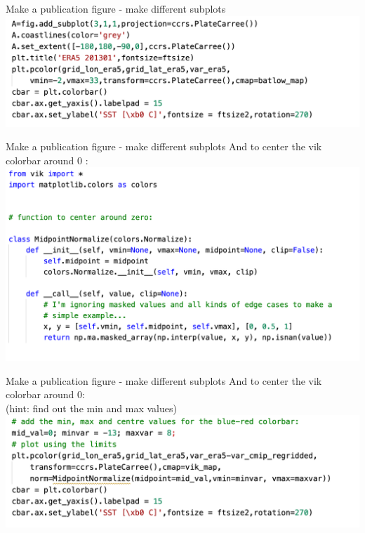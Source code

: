 \begin{frame}{\insertsectionnumber{ |} Make a publication figure - make different subplots} 
    \includegraphics[scale=0.35]{images/Script5_step5.png}
\end{frame}


\begin{frame}{\insertsectionnumber{ |} Make a publication figure - make different subplots} 
    And to center the vik colorbar around 0 : \\
        \vspace{0.3cm}
    \includegraphics[scale=0.35]{images/Script5_step6.png}
\end{frame}


\begin{frame}{\insertsectionnumber{ |} Make a publication figure - make different subplots} 
    And to center the vik colorbar around 0: \\
        \vspace{0.3cm}
    (hint: find out the min and max values) \\
        \vspace{0.3cm}
    \includegraphics[scale=0.35]{images/Script5_step7.png}
\end{frame}


